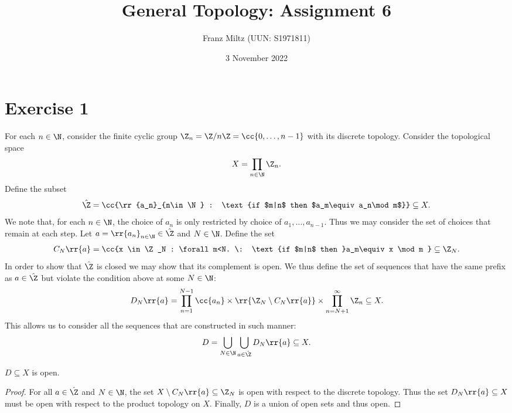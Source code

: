 \documentclass{article}
\begin{document}
\title{General Topology: Assignment 6}
\author{Franz Miltz (UUN: S1971811)}
\date{3 November 2022}
\maketitle

\section*{Exercise 1}

For each $n\in\N$, consider the finite cyclic group $\Z_n=\Z/n\Z=\cc{0,\ldots,n-1}$ with
its discrete topology. Consider the topological space
\begin{align*}
  X=\prod_{n\in\N} \Z_n.
\end{align*}
Define the subset
\begin{align*}
  \hat\Z = \cc{\rr{a_n}_{n\in\N} : \text{if $m|n$ then $a_m\equiv a_n\mod m$}} \subseteq X.
\end{align*}
We note that, for each $n\in\N$, the choice of $a_n$ is only restricted by choice of
$a_1,\ldots,a_{n-1}$. Thus we may consider the set of choices that remain at each step.
Let $a=\rr{a_n}_{n\in\N}\in\hat\Z$ and $N\in\N$. Define the set
\begin{align*}
  C_N\rr{a} = \cc{x \in \Z_N : \forall m<N. \: \text{if $m|n$ then }a_m\equiv x \mod m }\subseteq \Z_N.
\end{align*}
In order to show that $\hat\Z$ is closed we may show that its complement is open. We thus define the
set of sequences that have the same prefix as $a\in\hat\Z$ but violate the condition above
at some $N\in\N$:
\begin{align*}
  D_N\rr{a}=\prod_{n=1}^{N-1}\cc{a_n}\times\rr{\Z_N\setminus C_N\rr{a}}\times \prod_{n=N+1}^{\infty} \Z_n \subseteq X.
\end{align*}
This allows us to consider all the sequences that are constructed in such manner:
\begin{align*}
  D = \bigcup_{N\in\N}\bigcup_{a\in\hat\Z} D_N\rr{a} \subseteq X.
\end{align*}

\begin{claim*}
  $D\subseteq X$ is open.
  \begin{proof}
    For all $a\in\hat\Z$ and $N\in\N$, the set $X\setminus C_N\rr{a}\subseteq \Z_N$ is open with
    respect to the discrete topology. Thus the set $D_N\rr{a}\subseteq X$ must be open
    with respect to the product topology on $X$. Finally, $D$ is a union of open sets and
    thus open.
  \end{proof}
\end{claim*}
\end{document}
